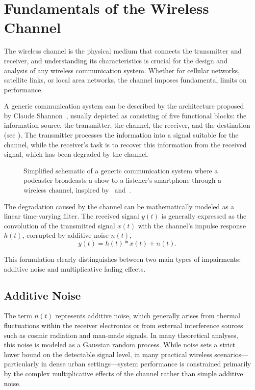 \section{Fundamentals of the Wireless Channel}

The wireless channel is the physical medium that connects the transmitter and receiver, and understanding its characteristics is crucial for the design and analysis of any wireless communication system. Whether for cellular networks, satellite links, or local area networks, the channel imposes fundamental limits on performance.

A generic communication system can be described by the architecture proposed by Claude Shannon~, usually depicted as consisting of five functional blocks: the information source, the transmitter, the channel, the receiver, and the destination (see ). The transmitter processes the information into a signal suitable for the channel, while the receiver's task is to recover this information from the received signal, which has been degraded by the channel.

\begin{figure}
  \centering
  \caption{Simplified schematic of a generic communication system where a podcaster broadcasts a show to a listener's smartphone through a wireless channel, inspired by~\cite[Fig.~1]{Shannon1948} and~\cite[Fig.~1.2]{Saunders2024}.}
\end{figure}

The degradation caused by the channel can be mathematically modeled as a linear time-varying filter. The received signal $y(t)$ is generally expressed as the convolution of the transmitted signal $x(t)$ with the channel's impulse response $h(t)$, corrupted by additive noise $n(t)$,
\begin{equation}
  y(t) = h(t) \ast x(t) + n(t).
\end{equation}

This formulation clearly distinguishes between two main types of impairments: additive noise and multiplicative fading effects.

\subsection{Additive Noise}

The term $n(t)$ represents additive noise, which generally arises from thermal fluctuations within the receiver electronics or from external interference sources such as cosmic radiation and man-made signals. In many theoretical analyses, this noise is modeled as a Gaussian random process. While noise sets a strict lower bound on the detectable signal level, in many practical wireless scenarios---particularly in dense urban settings---system performance is constrained primarily by the complex multiplicative effects of the channel rather than simple additive noise.

